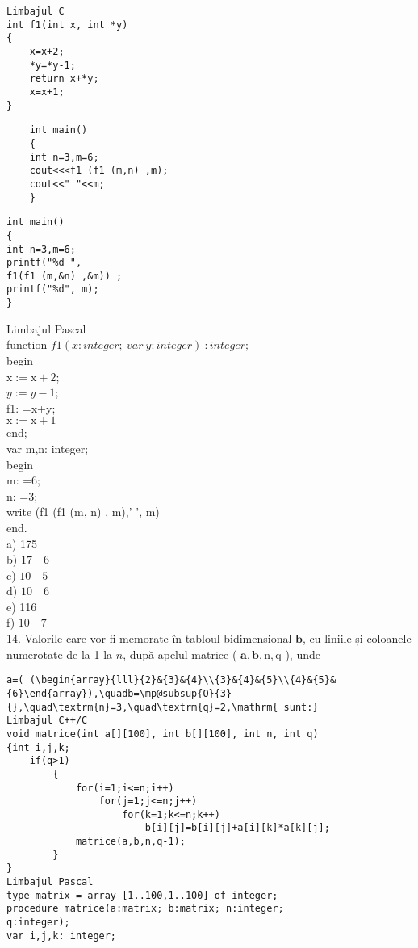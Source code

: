 \begin{verbatim}
Limbajul C
int f1(int x, int *y)
{
    x=x+2;
    *y=*y-1;
    return x+*y;
    x=x+1;
}
\end{verbatim}

\begin{verbatim}
    int main()
    {
    int n=3,m=6;
    cout<<<f1 (f1 (m,n) ,m);
    cout<<" "<<m;
    }
\end{verbatim}

\begin{verbatim}
int main()
{
int n=3,m=6;
printf("%d ",
f1(f1 (m,&n) ,&m)) ;
printf("%d", m);
}
\end{verbatim}

Limbajul Pascal\\
function $f 1(x: i n t e g e r ; ~ v a r ~ y: i n t e g e r) ~: i n t e g e r ; ~$\\
begin\\
$\mathrm{x}:=\mathrm{x}+2$;\\
$y:=y-1$;\\
f1: =x+y;\\
$\mathrm{x}:=\mathrm{x}+1$\\
end;\\
var m,n: integer;\\
begin\\
m: =6;\\
n: =3;\\
write (f1 (f1 (m, n) , m),' ', m)\\
end.\\
a) 175\\
b) $17 \quad 6$\\
c) $10 \quad 5$\\
d) $10 \quad 6$\\
e) 116\\
f) $10 \quad 7$\\
14. Valorile care vor fi memorate în tabloul bidimensional $\mathbf{b}$, cu liniile și coloanele numerotate de la 1 la $n$, după apelul matrice ( $\mathbf{a}, \mathbf{b}, \mathrm{n}, \mathrm{q}$ ), unde

\begin{verbatim}
a=( (\begin{array}{lll}{2}&{3}&{4}\\{3}&{4}&{5}\\{4}&{5}&{6}\end{array}),\quadb=\mp@subsup{O}{3}{},\quad\textrm{n}=3,\quad\textrm{q}=2,\mathrm{ sunt:}
Limbajul C++/C
void matrice(int a[][100], int b[][100], int n, int q)
{int i,j,k;
    if(q>1)
        {
            for(i=1;i<=n;i++)
                for(j=1;j<=n;j++)
                    for(k=1;k<=n;k++)
                        b[i][j]=b[i][j]+a[i][k]*a[k][j];
            matrice(a,b,n,q-1);
        }
}
Limbajul Pascal
type matrix = array [1..100,1..100] of integer;
procedure matrice(a:matrix; b:matrix; n:integer;
q:integer);
var i,j,k: integer;
\end{verbatim}

